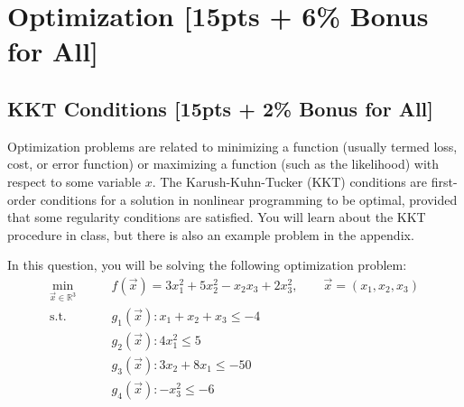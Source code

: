 \section{Optimization [15pts + 6\% Bonus for All]}
\subsection{KKT Conditions [15pts + 2\% Bonus for All]}
Optimization problems are related to minimizing a function (usually termed loss, cost, or error function) or maximizing a function (such as the likelihood) with respect to some variable $x$. The Karush-Kuhn-Tucker (KKT) conditions are first-order conditions for a solution in nonlinear programming to be optimal, provided that some regularity conditions are satisfied. You will learn about the KKT procedure in class, but there is also an example problem in the appendix.

In this question, you will be solving the following optimization problem:
\begin{align*}
    \min_{\vec{x} \in \mathbb{R}^3} \qquad & f(\vec{x}) = 3x_1^2 + 5x_2^2 - x_2x_3 + 2x_3^2, \qquad \vec{x} = (x_1,x_2,x_3) \\
    \text{s.t.} \qquad & g_1(\vec{x}) : x_1 + x_2 + x_3 \leq -4 \\
    & g_2(\vec{x}) : 4x_1^2 \leq 5 \\
    & g_3(\vec{x}) : 3x_2 + 8x_1 \leq -50 \\
    & g_4(\vec{x}) : -x_3^2 \leq -6 \\
\end{align*}

